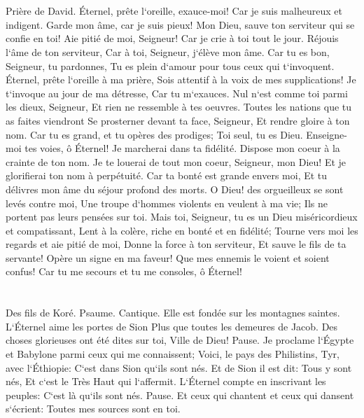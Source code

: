 \chapter{}

\verse Prière de David. Éternel, prête l`oreille, exauce-moi! Car je suis malheureux et indigent. 
\verse Garde mon âme, car je suis pieux! Mon Dieu, sauve ton serviteur qui se confie en toi! 
\verse Aie pitié de moi, Seigneur! Car je crie à toi tout le jour. 
\verse Réjouis l`âme de ton serviteur, Car à toi, Seigneur, j`élève mon âme. 
\verse Car tu es bon, Seigneur, tu pardonnes, Tu es plein d`amour pour tous ceux qui t`invoquent. 
\verse Éternel, prête l`oreille à ma prière, Sois attentif à la voix de mes supplications! 
\verse Je t`invoque au jour de ma détresse, Car tu m`exauces. 
\verse Nul n`est comme toi parmi les dieux, Seigneur, Et rien ne ressemble à tes oeuvres. 
\verse Toutes les nations que tu as faites viendront Se prosterner devant ta face, Seigneur, Et rendre gloire à ton nom. 
\verse Car tu es grand, et tu opères des prodiges; Toi seul, tu es Dieu. 
\verse Enseigne-moi tes voies, ô Éternel! Je marcherai dans ta fidélité. Dispose mon coeur à la crainte de ton nom. 
\verse Je te louerai de tout mon coeur, Seigneur, mon Dieu! Et je glorifierai ton nom à perpétuité. 
\verse Car ta bonté est grande envers moi, Et tu délivres mon âme du séjour profond des morts. 
\verse O Dieu! des orgueilleux se sont levés contre moi, Une troupe d`hommes violents en veulent à ma vie; Ils ne portent pas leurs pensées sur toi. 
\verse Mais toi, Seigneur, tu es un Dieu miséricordieux et compatissant, Lent à la colère, riche en bonté et en fidélité; 
\verse Tourne vers moi les regards et aie pitié de moi, Donne la force à ton serviteur, Et sauve le fils de ta servante! 
\verse Opère un signe en ma faveur! Que mes ennemis le voient et soient confus! Car tu me secours et tu me consoles, ô Éternel! 

\chapter{}

\verse Des fils de Koré. Psaume. Cantique. Elle est fondée sur les montagnes saintes. 
\verse L`Éternel aime les portes de Sion Plus que toutes les demeures de Jacob. 
\verse Des choses glorieuses ont été dites sur toi, Ville de Dieu! Pause. 
\verse Je proclame l`Égypte et Babylone parmi ceux qui me connaissent; Voici, le pays des Philistins, Tyr, avec l`Éthiopie: C`est dans Sion qu`ils sont nés. 
\verse Et de Sion il est dit: Tous y sont nés, Et c`est le Très Haut qui l`affermit. 
\verse L`Éternel compte en inscrivant les peuples: C`est là qu`ils sont nés. Pause. 
\verse Et ceux qui chantent et ceux qui dansent s`écrient: Toutes mes sources sont en toi. 

